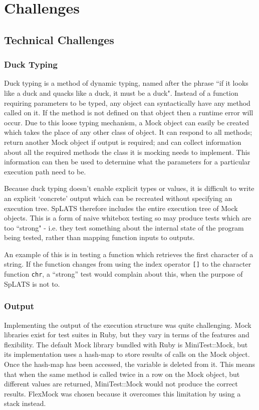 \chapter{Challenges}
\section{Technical Challenges}
  \subsection{Duck Typing}
    Duck typing is a method of dynamic typing, named after the phrase ``if it looks like a duck and quacks like a duck, it must be a duck". Instead of a function requiring parameters to be typed, any object can syntactically have any method called on it. If the method is not defined on that object then a runtime error will occur. Due to this loose typing mechanism, a Mock object can easily be created which takes the place of any other class of object. It can respond to all methods; return another Mock object if output is required; and can collect information about all the required methods the class it is mocking needs to implement. This information can then be used to determine what the parameters for a particular execution path need to be.
    
    Because duck typing doesn't enable explicit types or values, it is difficult to write an explicit `concrete' output which can be recreated without specifying an execution tree. SpLATS therefore includes the entire execution tree of Mock objects. This is a form of naive whitebox testing so may produce tests which are too ``strong" - i.e. they test something about the internal state of the program being tested, rather than mapping function inputs to outputs.
    
    An example of this is in testing a function which retrieves the first character of a string. If the function changes from using the index operator \texttt{[]} to the character function \texttt{chr}, a ``strong'' test would complain about this, when the purpose of SpLATS is not to.
    
  \subsection{Output}
    Implementing the output of the execution structure was quite challenging. Mock libraries exist for test suites in Ruby, but they vary in terms of the features and flexibility. The default Mock library bundled with Ruby is MiniTest::Mock, but its implementation uses a hash-map to store results of calls on the Mock object. Once the hash-map has been accessed, the variable is deleted from it. This means that when the same method is called twice in a row on the Mock object, but different values are returned, MiniTest::Mock would not produce the correct results. FlexMock was chosen because it overcomes this limitation by using a stack instead.

